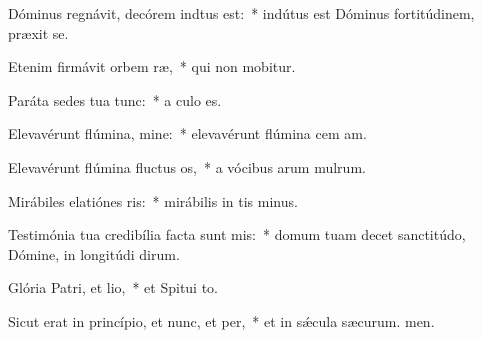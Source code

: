 \item Dóminus regnávit, decórem indtus est:~* indútus est Dóminus fortitúdinem,  præxit se.
\item Etenim firmávit orbem ræ,~* qui non mobitur.
\item Paráta sedes tua  tunc:~* a culo  es.
\item Elevavérunt flúmina, mine:~* elevavérunt flúmina cem am.
\item Elevavérunt flúmina fluctus os,~* a vócibus arum mulrum.
\item Mirábiles elatiónes ris:~* mirábilis in tis minus.
\item Testimónia tua credibília facta sunt mis:~* domum tuam decet sanctitúdo, Dómine, in longitúdi dirum.
\item Glória Patri, et lio,~* et Spitui to.
\item Sicut erat in princípio, et nunc, et per,~* et in sǽcula sæcurum. men.
